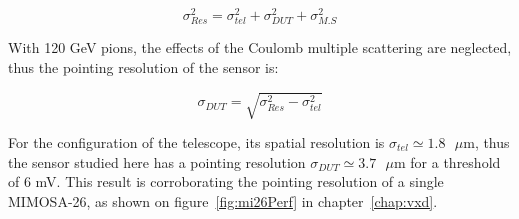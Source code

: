       \begin{equation}
        \sigma_{Res}^2 = \sigma_{tel}^2 + \sigma_{DUT}^2 + \sigma_{M.S}^2
        \label{eq:pointingResolution}
      \end{equation}

      With 120 GeV pions, the effects of the Coulomb multiple scattering are neglected, thus the pointing resolution of the sensor is:

      \begin{equation}
        \sigma_{DUT} = \sqrt{\sigma_{Res}^2 - \sigma_{tel}^2}
      \end{equation}

      For the configuration of the telescope, its spatial resolution is $\sigma_{tel} \simeq 1.8 \text{ }\mu\text{m}$, thus the sensor studied here has a pointing resolution $\sigma_{DUT} \simeq 3.7 \text{ }\mu\text{m}$ for a threshold of 6 mV.
      This result is corroborating the pointing resolution of a single MIMOSA-26, as shown on figure~\ref{fig:mi26Perf} in chapter~\ref{chap:vxd}.

